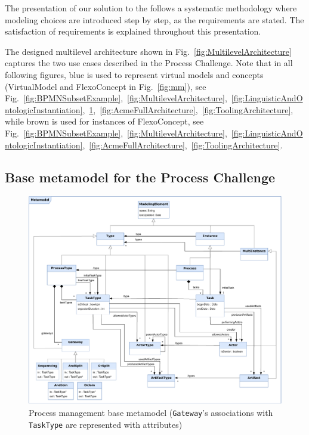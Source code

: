 
The presentation of our solution to the \mlpc follows a systematic methodology
where modeling choices are introduced step by step, as the requirements are
stated. The satisfaction of requirements is explained throughout this
presentation.


The designed multilevel architecture shown in
Fig.~\ref{fig:MultilevelArchitecture} captures the two use cases described in
the Process Challenge.
Note that in all following figures, blue is used to represent \FML virtual
models and concepts (\textsf{VirtualModel} and \textsf{FlexoConcept} in
Fig.~\ref{fig:mm}), see
Fig.~\ref{fig:BPMNSubsetExample},~\ref{fig:MultilevelArchitecture},~\ref{fig:LinguisticAndOntologicInstantiation},~\ref{fig:BaseMetamodel},~\ref{fig:AcmeFullArchitecture},~\ref{fig:ToolingArchitecture},
while brown is used for instances of \textsf{FlexoConcept}, see
Fig.~\ref{fig:BPMNSubsetExample},~\ref{fig:MultilevelArchitecture},~\ref{fig:LinguisticAndOntologicInstantiation},~\ref{fig:AcmeFullArchitecture},~\ref{fig:ToolingArchitecture}.

\subsection{Base metamodel for the Process Challenge}

\begin{figure}
 \centering
    \includegraphics[width=1.0 \textwidth]{Figures/Metamodel-17.pdf}
     \caption{Process management base metamodel (\texttt{Gateway}'s associations with \texttt{TaskType} are represented with attributes)}
    \label{fig:BaseMetamodel}
\end{figure}

